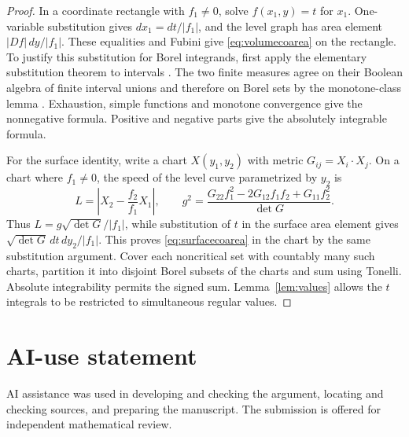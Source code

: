 \documentclass[11pt]{article}
\theoremstyle{remark}
\begin{document}
\begin{proof}
In a coordinate rectangle with $f_1\ne0$, solve $f(x_1,y)=t$
for $x_1$. One-variable substitution gives
$dx_1=dt/|f_1|$, and the level graph has area element
$|Df|\,dy/|f_1|$. These equalities and Fubini give
\eqref{eq:volumecoarea} on the rectangle.
To justify this substitution for Borel integrands, first
apply the elementary substitution theorem to intervals
\cite[Theorem 5.3.5]{LeblI}. The two finite measures agree
on their Boolean algebra of finite interval unions and
therefore on Borel sets by the monotone-class lemma
\cite[Lemma 1.7.14]{TaoMeasure}. Exhaustion, simple functions
and monotone convergence give the nonnegative formula.
Positive and negative parts give the absolutely integrable
formula.

For the surface identity, write a chart $X(y_1,y_2)$ with
metric $G_{ij}=X_i\cdot X_j$. On a chart where $f_1\ne0$,
the speed of the level curve parametrized by $y_2$ is
\[
 L=\left|X_2-\frac{f_2}{f_1}X_1\right|,\qquad
 g^2=\frac{G_{22}f_1^2-2G_{12}f_1f_2+G_{11}f_2^2}{\det G}.
\]
Thus $L=g\sqrt{\det G}/|f_1|$, while substitution of $t$
in the surface area element gives
$\sqrt{\det G}\,dt\,dy_2/|f_1|$. This proves
\eqref{eq:surfacecoarea} in the chart by the same substitution
argument. Cover each noncritical set with countably many
such charts, partition it into disjoint Borel subsets of
the charts and sum using Tonelli. Absolute integrability
permits the signed sum. Lemma~\ref{lem:values} allows the
$t$ integrals to be restricted to simultaneous regular values.
\end{proof}

\section*{AI-use statement}
AI assistance was used in developing and checking the argument,
locating and checking sources, and preparing the manuscript.
The submission is offered for independent mathematical review.
\end{document}
